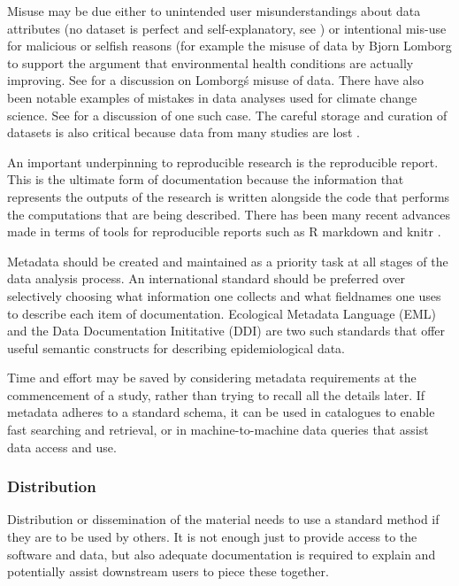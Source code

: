 \documentclass[11pt,a4paper]{article}
\begin{document}
Misuse may be due either to unintended user misunderstandings
about data attributes (no dataset is perfect and self-explanatory, see
\citet{Michener1997}) or intentional mis-use for malicious or selfish
reasons (for example the misuse of data by Bjorn Lomborg to support the
argument that environmental health conditions are actually improving.
See \citet{Bodnar2004} for a discussion on Lomborg\'s misuse
of data.  There have also been notable examples of mistakes in data
analyses used for climate change science.  See
\citet{Cai2010} for a discussion of one such case.  The
careful storage and curation of datasets is also critical because data from many
studies are lost \citep{Pullin2010,Vines2014a}.

An important underpinning to reproducible research is the reproducible
report. This is the ultimate form of documentation because the
information that represents the outputs of the research is written
alongside the code that performs the computations that are being
described. There has been many recent advances made in terms of tools
for reproducible reports such as R markdown and knitr \citep{Xie2014a}.

Metadata should be created and maintained as a priority task at all
stages of the data analysis process. An international standard should be
preferred over selectively choosing what information one collects and
what fieldnames one uses to describe each item of documentation.
Ecological Metadata Language (EML) and the Data Documentation
Inititative (DDI) are two such standards that offer useful semantic
constructs for describing epidemiological data.

Time and effort may be
saved by considering metadata requirements at the commencement of a
study, rather than trying to recall all the details later. If metadata
adheres to a standard schema, it can be used in catalogues to enable
fast searching and retrieval, or in machine-to-machine data queries that
assist data access and use.


\subsubsection{Distribution}\label{distribution}

Distribution or dissemination of the material needs to use a standard
method if they are to be used by others. It is not enough just to
provide access to the software and data, but also adequate documentation
is required to explain and potentially assist downstream users to piece
these together.
\end{document}
